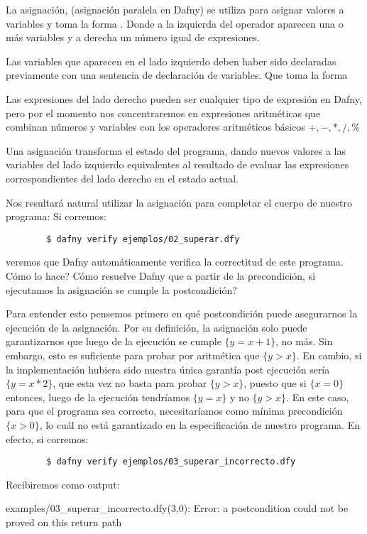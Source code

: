 \documentclass[12pt, a4paper, openany, fleqn]{book}
\begin{document}
    La asignación, (asignación paralela en Dafny) se utiliza para asignar valores a variables y toma la forma . Donde a la izquierda del operador \inlinedafny{:=} aparecen una o más variables y a derecha un número igual de expresiones.

    Las variables que aparecen en el lado izquierdo deben haber sido declaradas previamente con una sentencia de declaración de variables. Que toma la forma 

    Las expresiones del lado derecho pueden ser cualquier tipo de expresión en Dafny, pero por el momento nos concentraremos en expresiones aritméticas que combinan números y variables con los operadores aritméticos básicos $+,-,*,/,\%$

    Una asignación transforma el estado del programa, dando nuevos valores a las variables del lado izquierdo equivalentes al resultado de evaluar las expresiones correspondientes del lado derecho en el estado actual.

    Nos resultará natural utilizar la asignación para completar el cuerpo de nuestro programa:
    Si corremos:
    \begin{verbatim}
        $ dafny verify ejemplos/02_superar.dfy
    \end{verbatim}
    veremos que Dafny automáticamente verifica la correctitud de este programa. Cómo lo hace? Cómo resuelve Dafny que a partir de la precondición, si ejecutamos la asignación  se cumple la postcondición?

    Para entender esto pensemos primero en qué postcondición puede asegurarnos la ejecución de la asignación. Por su definición, la asignación solo puede garantizarnos que luego de la ejecución se cumple $\{ y = x + 1 \}$, no más. Sin embargo, esto es suficiente para probar por aritmética que $\{ y > x \}$.
    En cambio, si la implementación hubiera sido
    nuestra única garantía post ejecución sería $\{ y = x * 2 \}$, que esta vez no basta para probar $\{ y > x \}$, puesto que si $\{x = 0\}$ entonces, luego de la ejecución tendríamos $\{y = x\}$ y no $\{ y > x \}$. En este caso, para que el programa sea correcto, necesitaríamos como mínima precondición $\{ x > 0 \}$, lo cuál no está garantizado en la especificación de nuestro programa.
    En efecto, si corremos:
    \begin{verbatim}
        $ dafny verify ejemplos/03_superar_incorrecto.dfy
    \end{verbatim}
    Recibiremos como output:
    \begin{spverbatim}
    examples/03_superar_incorrecto.dfy(3,0): Error: a postcondition could not be proved on this return path
    \end{spverbatim}
\end{document}
